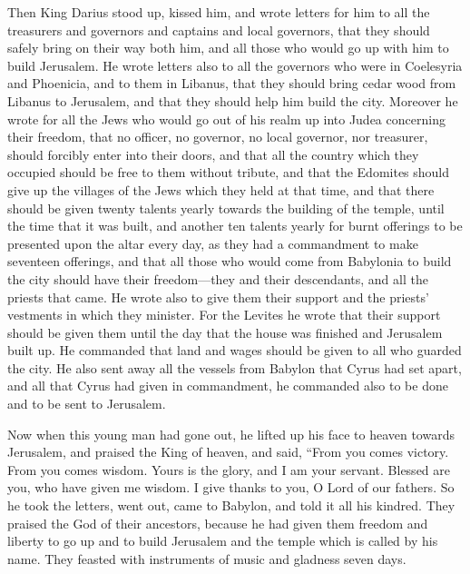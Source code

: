  Then King Darius stood up, kissed him, and wrote letters
for him to all the treasurers and governors and captains and local
governors, that they should safely bring on their way both him, and all
those who would go up with him to build Jerusalem.  He
wrote letters also to all the governors who were in Coelesyria and
Phoenicia, and to them in Libanus, that they should bring cedar wood
from Libanus to Jerusalem, and that they should help him build the city.
 Moreover he wrote for all the Jews who would go out of his
realm up into Judea concerning their freedom, that no officer, no
governor, no local governor, nor treasurer, should forcibly enter into
their doors,  and that all the country which they occupied
should be free to them without tribute, and that the Edomites should
give up the villages of the Jews which they held at that time,
 and that there should be given twenty talents yearly
towards the building of the temple, until the time that it was built,
 and another ten talents yearly for burnt offerings to be
presented upon the altar every day, as they had a commandment to make
seventeen offerings,  and that all those who would come
from Babylonia to build the city should have their freedom---they and
their descendants, and all the priests that came.  He wrote
also to give them their support and the priests' vestments in which they
minister.  For the Levites he wrote that their support
should be given them until the day that the house was finished and
Jerusalem built up.  He commanded that land and wages
should be given to all who guarded the city.  He also sent
away all the vessels from Babylon that Cyrus had set apart, and all that
Cyrus had given in commandment, he commanded also to be done and to be
sent to Jerusalem.

 Now when this young man had gone out, he lifted up his
face to heaven towards Jerusalem, and praised the King of heaven,
 and said, ``From you comes victory. From you comes wisdom.
Yours is the glory, and I am your servant.  Blessed are
you, who have given me wisdom. I give thanks to you, O Lord of our
fathers.  So he took the letters, went out, came to
Babylon, and told it all his kindred.  They praised the God
of their ancestors, because he had given them freedom and liberty
 to go up and to build Jerusalem and the temple which is
called by his name. They feasted with instruments of music and gladness
seven days.

